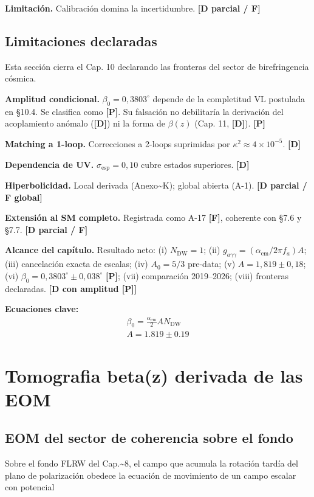 ﻿\documentclass[11pt,letterpaper]{article}
\begin{document}
\textbf{Limitación.} Calibración domina la incertidumbre. \textbf{[D parcial / F]}
\subsection{Limitaciones declaradas}
Esta sección cierra el Cap. 10 declarando las fronteras del sector de birefringencia cósmica.

\textbf{Amplitud condicional.} $\beta_0 = 0{,}3803^\circ$ depende de la completitud VL postulada en §10.4. Se clasifica como \textbf{[P]}. Su falsación no debilitaría la derivación del acoplamiento anómalo (\textbf{[D]}) ni la forma de $\beta(z)$ (Cap. 11, \textbf{[D]}). \textbf{[P]}

\textbf{Matching a 1-loop.} Correcciones a 2-loops suprimidas por $\kappa^2 \approx 4 \times 10^{-5}$. \textbf{[D]}

\textbf{Dependencia de UV.} $\sigma_{\text{esp}} = 0{,}10$ cubre estados superiores. \textbf{[D]}

\textbf{Hiperbolicidad.} Local derivada (Anexo\textasciitilde{}K); global abierta (A-1). \textbf{[D parcial / F global]}

\textbf{Extensión al SM completo.} Registrada como A-17 \textbf{[F]}, coherente con §7.6 y §7.7. \textbf{[D parcial / F]}

\textbf{Alcance del capítulo.} Resultado neto: (i) $N_{\text{DW}} = 1$; (ii) $g_{a\gamma\gamma} = (\alpha_{\text{em}}/2\pi f_a)A$; (iii) cancelación exacta de escalas; (iv) $A_0 = 5/3$ pre-data; (v) $A = 1{,}819 \pm 0{,}18$; (vi) $\beta_0 = 0{,}3803^\circ \pm 0{,}038^\circ$ \textbf{[P]}; (vii) comparación 2019--2026; (viii) fronteras declaradas. \textbf{[D con amplitud [P]]}

\textbf{Ecuaciones clave:}
\begin{align*}
    \beta_0 = \frac{\alpha_{\mathrm{em}}}{2} A N_{\mathrm{DW}} \\
    A = 1.819 \pm 0.19
\end{align*}
\section{Tomografia beta(z) derivada de las EOM}
\subsection{EOM del sector de coherencia sobre el fondo}
Sobre el fondo FLRW del Cap.\textasciitilde{}8, el campo que acumula la rotación tardía del plano de polarización obedece la ecuación de movimiento de un campo escalar con potencial
\end{document}

